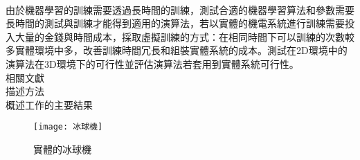 \begin{flushleft}
\fontsize{12pt}{12pt} \\
\end{flushleft}

由於機器學習的訓練需要透過長時間的訓練，測試合適的機器學習算法和參數需要長時間的測試與訓練才能得到適用的演算法，若以實體的機電系統進行訓練需要投入大量的金錢與時間成本，採取虛擬訓練的方式：在相同時間下可以訓練的次數較多實體環境中多，改善訓練時間冗長和組裝實體系統的成本。測試在2D環境中的演算法在3D環境下的可行性並評估演算法若套用到實體系統可行性。\\

相關文獻\\

描述方法\\

概述工作的主要結果\\


\begin{figure}[hbt!]
\begin{center}
\texttt{[image: 冰球機]}	
\caption{實體的冰球機}\label{fig.冰球機}	
\end{center}
\end{figure}
